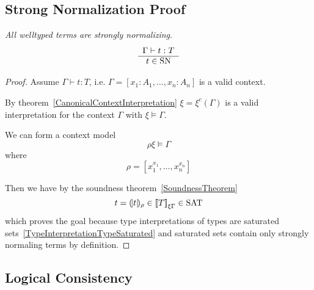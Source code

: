 \subsection{Strong Normalization Proof}


\begin{theorem}
    \label{StrongNormalizationProof}
    \emph{All welltyped terms are strongly normalizing}.
    $$
    \begin{array}{c} 
        \Gamma \vdash t : T
     \\ \hline 
        t \in \text{SN}
    \end{array}
    $$


    \begin{proof}
        Assume $\Gamma \vdash t : T$, i.e. $\Gamma = [x_1 : A_1, \ldots, x_n :
        A_n]$ is a valid context.

        By theorem~\ref{CanonicalContextInterpretation} $\xi = \xi^c(\Gamma)$ is
        a valid interpretation for the context $\Gamma$ with $\xi \vDash
        \Gamma$.

        We can form a context model
        $$
        \rho\xi \vDash \Gamma
        $$
        where
        $$
        \rho = [x_1^{x_1}, \ldots, x_n^{x_n}]
        $$

        Then we have by the soundness theorem~\ref{SoundnessTheorem}
        $$
        t = {(\!|t|\!)_{\rho}} \in {{[\![}T{]\!]}}_{\xi\Gamma} \in \text{SAT}
        $$
        which proves the goal because type interpretations of types are
        saturated sets~\ref{TypeInterpretationTypeSaturated} and saturated sets
        contain only strongly normaling terms by definition.
    \end{proof}
\end{theorem}




\subsection{Logical Consistency}

